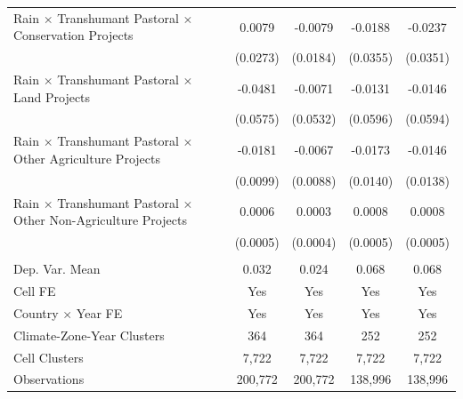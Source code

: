{\begin{tabular}{l*{4}{c}}
\addlinespace
\hspace{15pt} Rain $\times$ Transhumant Pastoral $\times$ Conservation Projects&      0.0079         &     -0.0079         &     -0.0188         &     -0.0237         \\
                    &    (0.0273)         &    (0.0184)         &    (0.0355)         &    (0.0351)         \\
\addlinespace
\hspace{15pt} Rain $\times$ Transhumant Pastoral $\times$ Land Projects&     -0.0481         &     -0.0071         &     -0.0131         &     -0.0146         \\
                    &    (0.0575)         &    (0.0532)         &    (0.0596)         &    (0.0594)         \\
\addlinespace
\hspace{15pt} Rain $\times$ Transhumant Pastoral $\times$ Other Agriculture Projects&     -0.0181\sym{*}  &     -0.0067         &     -0.0173         &     -0.0146         \\
                    &    (0.0099)         &    (0.0088)         &    (0.0140)         &    (0.0138)         \\
\addlinespace
\hspace{15pt} Rain $\times$ Transhumant Pastoral $\times$ Other Non-Agriculture Projects&      0.0006         &      0.0003         &      0.0008         &      0.0008         \\
                    &    (0.0005)         &    (0.0004)         &    (0.0005)         &    (0.0005)         \\
\midrule
\\ Dep. Var. Mean   &       0.032         &       0.024         &       0.068         &       0.068         \\
Cell FE             &         Yes         &         Yes         &         Yes         &         Yes         \\
Country $\times$ Year FE&         Yes         &         Yes         &         Yes         &         Yes         \\
Climate-Zone-Year Clusters&         364         &         364         &         252         &         252         \\
Cell Clusters       &       7,722         &       7,722         &       7,722         &       7,722         \\
Observations        &     200,772         &     200,772         &     138,996         &     138,996         \\
\bottomrule
\end{tabular}
}
